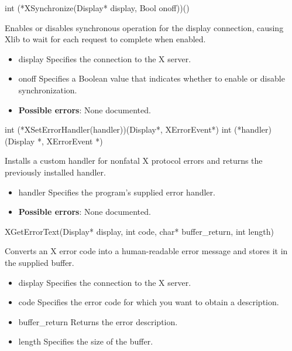 \documentclass{report}
\begin{document}
\begin{itemize}
        \begin{cppcode}
            int (*XSynchronize(Display* display, Bool onoff))()
        \end{cppcode}
        \bigbreak \noindent
        Enables or disables synchronous operation for the display connection, causing Xlib to wait for each request to complete when enabled.
        \begin{itemize}
            \item display Specifies the connection to the X server.
            \item onoff Specifies a Boolean value that indicates whether to enable or disable synchronization.
        \end{itemize}

        \begin{itemize}
            \item \textbf{Possible errors}: None documented.
        \end{itemize}

        \begin{cppcode}
            int (*XSetErrorHandler(handler))(Display*, XErrorEvent*)
                int (*handler)(Display *, XErrorEvent *)
        \end{cppcode}
        \bigbreak \noindent
        Installs a custom handler for nonfatal X protocol errors and returns the previously installed handler.

        \begin{itemize}
            \item handler Specifies the program’s supplied error handler.
        \end{itemize}

        \begin{itemize}
            \item \textbf{Possible errors}: None documented.
        \end{itemize}

        \begin{cppcode}
            XGetErrorText(Display* display, int code, char* buffer_return, int length)
        \end{cppcode}
        \bigbreak \noindent
        Converts an X error code into a human-readable error message and stores it in the supplied buffer.

        \begin{itemize}
            \item display Specifies the connection to the X server.
            \item code Specifies the error code for which you want to obtain a description.
            \item buffer\_return Returns the error description.
            \item length Specifies the size of the buffer.
        \end{itemize}


\end{itemize}
\end{document}
